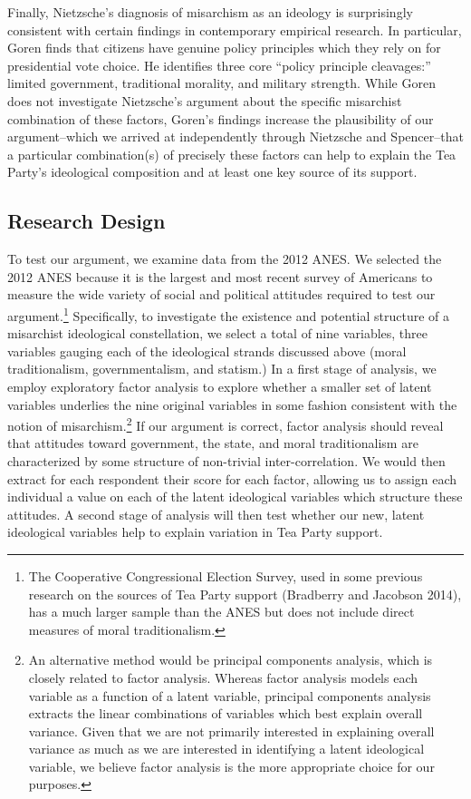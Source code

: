 \documentclass[12pt,]{article}
\let\rmarkdownfootnote\footnote%
\def\footnote{\protect\rmarkdownfootnote}
\begin{document}
Finally, Nietzsche's diagnosis of misarchism as an ideology is
surprisingly consistent with certain findings in contemporary empirical
research. In particular, Goren finds that citizens have genuine policy
principles which they rely on for presidential vote choice. He
identifies three core ``policy principle cleavages:'' limited
government, traditional morality, and military strength. While Goren
does not investigate Nietzsche's argument about the specific misarchist
combination of these factors, Goren's findings increase the plausibility
of our argument--which we arrived at independently through Nietzsche and
Spencer--that a particular combination(s) of precisely these factors can
help to explain the Tea Party's ideological composition and at least one
key source of its support.

\subsection{Research Design}\label{research-design}

To test our argument, we examine data from the 2012 ANES. We selected
the 2012 ANES because it is the largest and most recent survey of
Americans to measure the wide variety of social and political attitudes
required to test our argument.\footnote{The Cooperative Congressional
  Election Survey, used in some previous research on the sources of Tea
  Party support (Bradberry and Jacobson 2014), has a much larger sample
  than the ANES but does not include direct measures of moral
  traditionalism.} Specifically, to investigate the existence and
potential structure of a misarchist ideological constellation, we select
a total of nine variables, three variables gauging each of the
ideological strands discussed above (moral traditionalism,
governmentalism, and statism.) In a first stage of analysis, we employ
exploratory factor analysis to explore whether a smaller set of latent
variables underlies the nine original variables in some fashion
consistent with the notion of
misarchism.\footnote{An alternative method would be principal components analysis, which is closely related to factor analysis. Whereas factor analysis models each variable as a function of a latent variable, principal components analysis extracts the linear combinations of variables which best explain overall variance. Given that we are not primarily interested in explaining overall variance as much as we are interested in identifying a latent ideological variable, we believe factor analysis is the more appropriate choice for our purposes.}
If our argument is correct, factor analysis should reveal that attitudes
toward government, the state, and moral traditionalism are characterized
by some structure of non-trivial inter-correlation. We would then
extract for each respondent their score for each factor, allowing us to
assign each individual a value on each of the latent ideological
variables which structure these attitudes. A second stage of analysis
will then test whether our new, latent ideological variables help to
explain variation in Tea Party support.
\end{document}
